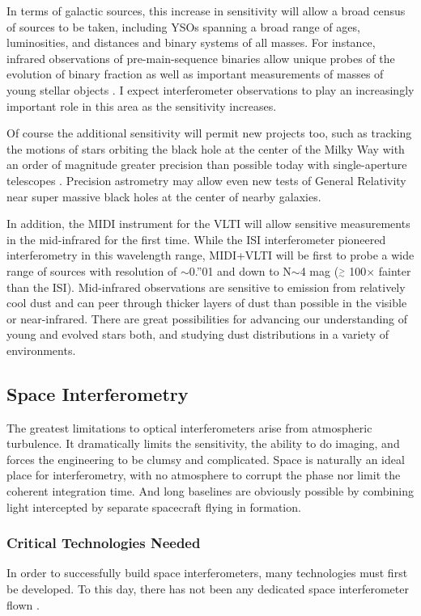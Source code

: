\documentclass[12pt]{iopart}
\newcommand{\simge}{\mbox{$\stackrel{>}{_{\sim}}$}}
\begin{document}
In terms of galactic sources, this increase in sensitivity will allow
a broad census of sources to be taken, including YSOs spanning a broad
range of ages, luminosities, and distances and binary systems of all
masses.  For instance, infrared observations of pre-main-sequence
binaries allow unique probes of the evolution of binary fraction
\citep[e.g.,][]{ghez1993} as well as important measurements of masses
of young stellar objects \citep{tamazian2002}.  I expect
interferometer observations to play an increasingly important role in
this area as the sensitivity increases.

Of course the additional sensitivity will permit new projects too,
such as tracking the motions of stars orbiting the black hole at the
center of the Milky Way with an order of magnitude greater precision
than possible today with single-aperture telescopes
\citep[e.g.,][]{genzel2002}.  Precision astrometry may allow even new
tests of General Relativity near super massive black holes at the
center of nearby galaxies.

In addition, the MIDI instrument for the VLTI will allow sensitive
measurements in the mid-infrared for the first time. While the ISI
interferometer pioneered interferometry in this wavelength range,
MIDI+VLTI will be first to probe a wide range of sources with
resolution of $\sim$0.''01 and down to N$\sim$4 mag ($\simge$
100$\times$ fainter than the ISI).  Mid-infrared observations are
sensitive to emission from relatively cool dust and can peer through
thicker layers of dust than possible in the visible or near-infrared.
There are great possibilities for advancing our understanding of young
and evolved stars both, and studying dust distributions in a variety
of environments.

\subsection{Space Interferometry}
\label{spaceinterferometers}

The greatest limitations to optical interferometers arise from
atmospheric turbulence.  It dramatically limits the sensitivity, the
ability to do imaging, and forces the engineering to be clumsy and
complicated.  Space is naturally an ideal place for interferometry,
with no atmosphere to corrupt the phase nor limit the coherent
integration time. And long baselines are obviously possible by
combining light intercepted by separate spacecraft flying in
formation.

\subsubsection{Critical Technologies Needed}
In order to successfully build space interferometers, many
technologies must first be developed.  To this day, there has not been
any dedicated space interferometer flown \citep[except for the Fine
Guidance Sensors on the Hubble Space Telescopes; e.g.][]{franz1991}.
\end{document}
